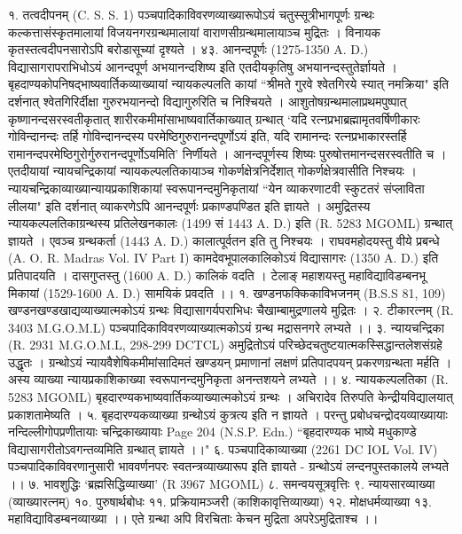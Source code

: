 १. तत्वदीपनम् (C. S. S. 1)
पञ्चपादिकाविवरणव्याख्यारूपोऽयं चतुस्सूत्रीभागपूर्णः ग्रन्थः कल्कत्तासंस्कृतमालायां विजयनगरग्रन्थमालायां वाराणसीग्रन्थमालायाञ्च मुद्रितः । विनायक कृतस्तत्वदीपनसारोऽपि बरोडासूच्यां दृश्यते ।
४३. आनन्दपूर्णः (1275-1350 A. D.)
विद्यासागरापराभिधोऽयं आनन्दपूर्ण अभयानन्दशिष्य इति एतदीयकृतिषु अभयानन्दस्तुतेर्ज्ञायते । बृहदाण्यकोपनिषद्भाष्यवार्तिकव्याख्यायां न्यायकल्पलति कायां ``श्रीमते गुरवे श्वेतगिरये स्यात् नमक्रिया" इति दर्शनात् श्वेतगिरिर्दीक्षा गुरुरभयानन्दो विद्यागुरुरिति च निश्चियते । आशुतोषग्रन्थमालाप्रथमपुष्पात् कृष्णानन्दसरस्वतीकृतात् शारीरकमीमांसाभाष्यवार्तिकाख्यात् ग्रन्थात् `यदि रत्नप्रभाब्रह्मामृतवर्षिणीकारः गोविन्दानन्दः तर्हि गोविन्दानन्दस्य परमेष्ठिगुरुरानन्दपूर्णोऽयं इति, यदि रामानन्दः रत्नप्रभाकारस्तर्हि रामानन्दपरमेष्ठिगुरोर्गुरुरानन्दपूर्णोऽयमिति' निर्णीयते । आनन्दपूर्णस्य शिष्यः पुरुषोत्तमानन्दसरस्वतीति च ।
एतदीयायां न्यायचन्द्रिकायां न्यायकल्पलतिकायाञ्च गोकर्णक्षेत्रनिर्देशात् गोकर्णक्षेत्रवासीति निश्चयः । न्यायचन्द्रिकाव्याख्यान्यायप्रकाशिकायां स्वरूपानन्दमुनिकृतायां ``येन व्याकरणाटवी स्कुटतरं संप्लाविता लीलया" इति दर्शनात् व्याकरणेऽपि आनन्दपूर्णः प्रकाण्डपण्डित इति ज्ञायते । अमुद्रितस्य न्यायकल्पलतिकाग्रन्थस्य प्रतिलेखनकालः (1499 सं  1443 A. D.) इति (R. 5283 MGOML) ग्रन्थात् ज्ञायते । एवञ्च ग्रन्थकर्ता (1443 A. D.) कालात्पूर्वतन इति तु निश्चयः । राघवमहोदयस्तु वीये प्रबन्धे (A. O. R. Madras Vol. IV Part I) कामदेवभूपालकालिकोऽयं विद्यासागरः (1350 A. D.) इति प्रतिपादयति । दासगुप्तस्तु (1600 A. D.) कालिकं वदति । टेलाङ् महाशयस्तु महाविद्याविडम्बनभू मिकायां (1529-1600 A. D.) सामयिकं प्रवदति ।।
१. खण्डनफक्किकाविभजनम् (B.S.S 81, 109)
खण्डनखण्डखाद्यव्याख्यात्मकोऽयं ग्रन्थः विद्यासागर्यपराभिधः चैखाम्बामुद्रणालये मुद्रितः ।
२. टीकारत्नम् (R. 3403 M.G.O.M.L) पञ्चपादिकाविवरणव्याख्यात्मकोऽयं ग्रन्थ मद्रासनगरे लभ्यते ।।
३. न्यायचन्द्रिका (R. 2931 M.G.O.M.L, 298-299 DCTCL)
अमुद्रितोऽयं परिच्छेदचतुष्टयात्मकस्सिद्धान्तलेशसंग्रहे उद्धृतः । ग्रन्थोऽयं न्यायवैशेषिकमीमांसादिमतं खण्डयन् प्रमाणानां लक्षणं प्रतिपादपयन् प्रकरणग्रन्थता मर्हति । अस्य व्याख्या न्यायप्रकाशिकाख्या स्वरूपानन्दमुनिकृता अनन्तशयने लभ्यते ।।
४. न्यायकल्पलतिका (R. 5283 MGOML)
बृहदारण्यकभाष्यवार्तिकव्याख्यात्मकोऽयं ग्रन्थः । अचिरादेव तिरुपति केन्द्रीयविद्यालयात् प्रकाशतामेष्यति ।
५. बृहदारण्यकव्याख्या
ग्रन्थोऽयं कुत्रत्य इति न ज्ञायते । परन्तु प्रबोधचन्द्रोदयव्याख्यायाः नन्दिल्लीगोपप्रणीतायाः चन्द्रिकाख्यायाः Page 204 (N.S.P. Edn.) ``बृहदारण्यक भाष्ये मधुकाण्डे विद्यासागरीतोऽवगन्तव्यमिति ग्रन्थात् ज्ञायते ।।"
६. पञ्चपादिकाव्याख्या (2261 DC IOL Vol. IV)
पञ्चपादिकाविवरणानुसारी भाववर्णनपरः स्वतन्त्रव्याख्यारूप इति ज्ञायते - ग्रन्थोऽयं लन्दनपुस्तकालये लभ्यते ।।
७. भावशुद्धिः `ब्रह्मसिद्धिव्याख्या' (R 3967 MGOML) ८. समन्वयसूत्रवृत्तिः ९. न्यायसारव्याख्या (व्याख्यारत्नम्) १०. पुरुषार्थबोधः ११. प्रक्रियामञ्जरी (काशिकावृत्तिव्याख्या) १२. मोक्षधर्मव्याख्या १३. महाविद्याविडम्बनव्याख्या ।। एते ग्रन्था अपि विरचिताः केचन मुद्रिता अपरेऽमुद्रिताश्च ।।
